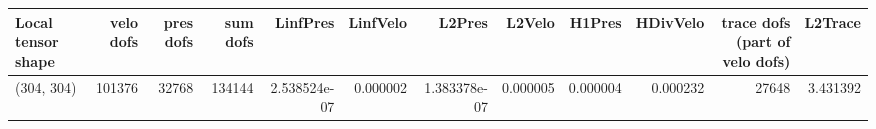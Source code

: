 \begin{tabular}{lrrrrrrrrrrr}
\toprule
Local tensor shape &  velo dofs &  pres dofs &  sum dofs &     LinfPres &  LinfVelo &       L2Pres &   L2Velo &   H1Pres &  HDivVelo &  trace dofs (part of velo dofs) &  L2Trace \\
\midrule
        (304, 304) &     101376 &      32768 &    134144 & 2.538524e-07 &  0.000002 & 1.383378e-07 & 0.000005 & 0.000004 &  0.000232 &                           27648 & 3.431392 \\
\bottomrule
\end{tabular}
